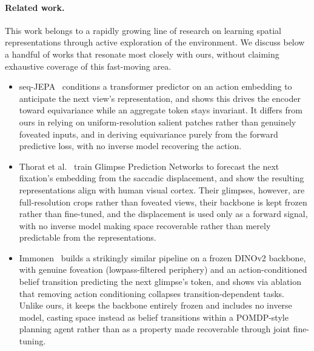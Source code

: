 \documentclass{article}
\begin{document}
\paragraph{Related work.}
This work belongs to a rapidly growing line of research on learning spatial representations through active exploration of the environment. We discuss below a handful of works that resonate most closely with ours, without claiming exhaustive coverage of this fast-moving area.\begin{itemize}
    \item seq-JEPA~\cite{ghaemi2026seq} conditions a transformer predictor on an action embedding to anticipate the next view's representation, and shows this drives the encoder toward equivariance while an aggregate token stays invariant. It differs from ours in relying on uniform-resolution salient patches rather than genuinely foveated inputs, and in deriving equivariance purely from the forward predictive loss, with no inverse model recovering the action.
    \item Thorat et al.~\cite{thorat2025predicting} train Glimpse Prediction Networks to forecast the next fixation's embedding from the saccadic displacement, and show the resulting representations align with human visual cortex. Their glimpses, however, are full-resolution crops rather than foveated views, their backbone is kept frozen rather than fine-tuned, and the displacement is used only as a forward signal, with no inverse model making space recoverable rather than merely predictable from the representations.
    \item Immonen~\cite{immonen2026action} builds a strikingly similar pipeline on a frozen DINOv2 backbone, with genuine foveation (lowpass-filtered periphery) and an action-conditioned belief transition predicting the next glimpse's token, and shows via ablation that removing action conditioning collapses transition-dependent tasks. Unlike ours, it keeps the backbone entirely frozen and includes no inverse model, casting space instead as belief transitions within a POMDP-style planning agent rather than as a property made recoverable through joint fine-tuning.
    
\end{itemize} 
\end{document}
